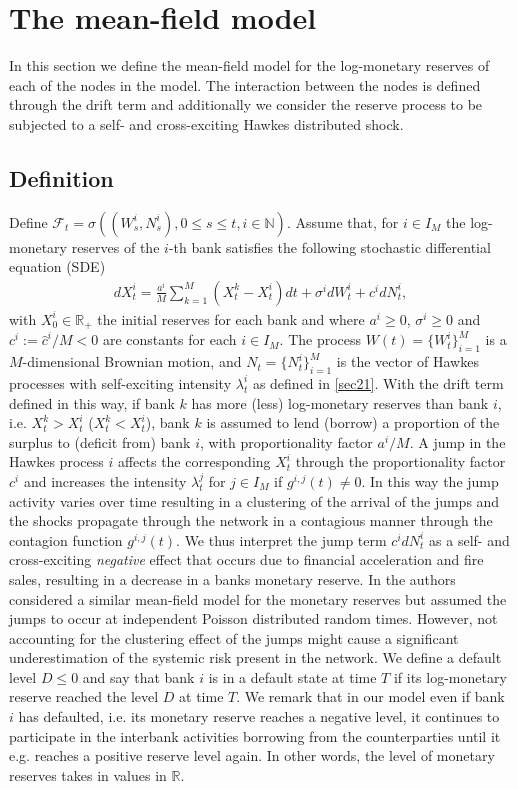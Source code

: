 \documentclass[10pt]{article}
\theoremstyle{plain}
\theoremstyle{definition}
\newcommand{\<}{\langle}
\renewcommand{\>}{\rangle}
\renewcommand{\(}{\left(}
\renewcommand{\)}{\right)}
\renewcommand{\[}{\left[}
\renewcommand{\]}{\right]}
\newcommand{\blu}[1]{\textcolor{blue}{#1}}
\begin{document}
\section{The mean-field model}\label{sec3}
In this section we define the mean-field model for the log-monetary reserves of each of the nodes in the model. The interaction between the nodes is defined through the drift term and additionally we consider the reserve process to be subjected to a self- and cross-exciting Hawkes distributed shock.
\subsection{Definition}
Define $\mathcal{F}_t=\sigma((W_s^i, N_s^i),0\leq s\leq t, i\in\mathbb{N})$. Assume that, for $i \in  I_{M}$ the log-monetary reserves of the $i$-th bank satisfies the following stochastic differential equation (SDE) %
\begin{align}
dX^i_t = \frac{a^i}{M}\sum\limits_{k = 1}^{M}(X^k_t-X^i_t)dt + \sigma^i d W_t^i + c^i dN^i_t,
\end{align}
with $X_0^i\in\mathbb{R}_+$ the initial reserves for each bank and where $a^i\geq 0$,
$\sigma^i\geq 0$ and $c^i:=\hat c^i/M<0$ are constants for each $i\in I_{M}$.
The process $W(t) = \{ W_t^i\}_{i=1}^M$ is a $M$-dimensional Brownian motion, 
and $N_t = \{N_t^i\}_{i=1}^M$ is the vector of Hawkes processes with self-exciting intensity $\lambda^i_t$ as defined in \ref{sec21}. With the drift term defined in this way, if bank $k$ has more (less) log-monetary reserves than bank $i$, i.e. $X_t^k>X_t^i$ ($X_t^k<X_t^i$), bank $k$ is assumed to lend (borrow) a proportion of the surplus to (deficit from) bank $i$, with proportionality factor $a^i/M$. A jump in the Hawkes process $i$ affects the corresponding $X_t^i$ through the proportionality factor $c^i$ and increases the intensity $\lambda_t^j$ for $j\in I_M$ if $g^{i,j}(t)\neq 0$. In this way the jump activity varies over time resulting in a clustering of the arrival of the jumps and the shocks propagate through the network in a contagious manner through the contagion function $g^{i,j}(t)$. We thus interpret the jump term $c^i dN_t^i$ as a self- and cross-exciting \emph{negative} effect that occurs due to financial acceleration and fire sales, resulting in a decrease in a banks monetary reserve. In \citet{capponi15} the authors considered a similar mean-field model for the monetary reserves but assumed the jumps to occur at independent Poisson distributed random times. However, not accounting for the clustering effect of the jumps might cause a significant underestimation of the systemic risk present in the network. We define a default level $D \leq 0$ and say that bank $i$ is in a default state at time $T$ if its log-monetary reserve reached the level $D$ at time $T$. We remark that in our model even if bank $i$ has defaulted, i.e. its monetary reserve reaches a negative level, it continues to participate in the interbank activities borrowing from the counterparties until it e.g. reaches a positive reserve level again. In other words, the level of monetary reserves takes in values in $\mathbb{R}$. %
\end{document}
